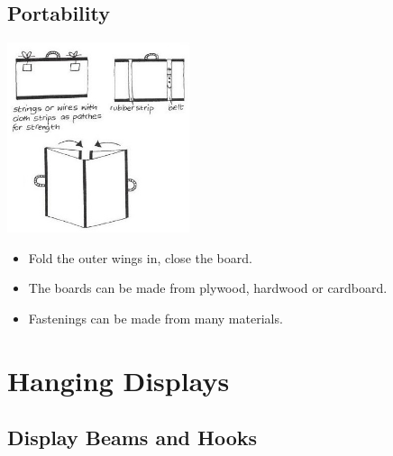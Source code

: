 \begin{multicols}{2}
\subsection{Portability}

\begin{center}
\includegraphics[width=0.4\textwidth]{./img/vso/zigzag-portability.jpg}
\end{center}

\begin{itemize}
\item Fold the outer wings in,
close the board.
\item The boards can be made from
plywood, hardwood or
cardboard.
\item Fastenings can be made from
many materials.
\end{itemize}

%
%


\section{Hanging Displays}


\subsection{Display Beams and Hooks}


\end{multicols}
